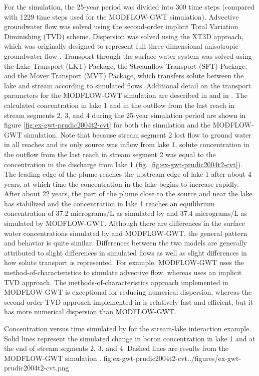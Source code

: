 For the \mf simulation, the 25-year period was divided into 300 time steps (compared with 1229 time steps used for the MODFLOW-GWT simulation).  Advective groundwater flow was solved using the second-order implicit Total Variation Diminishing (TVD) scheme.  Dispersion was solved using the XT3D approach, which was originally designed to represent full three-dimensional anisotropic groundwater flow \citep{modflow6xt3d}.  Transport through the surface water system was solved using the Lake Transport (LKT) Package, the Streamflow Transport (SFT) Package, and the Mover Transport (MVT) Package, which transfers solute between the lake and stream according to simulated flows.  Additional detail on the transport parameters for the MODFLOW-GWT simulation are described in \cite{modflowsfr1pack} and in \cite{modflowlak3pack}.  The calculated concentration in lake 1 and in the outflow from the last reach in stream segments 2, 3, and 4 during the 25-year simulation period are shown in figure \ref{fig:ex-gwt-prudic2004t2-cvt} for both the \mf simulation and the MODFLOW-GWT simulation.  Note that because stream segment 2 lost flow to ground water in all reaches and its only source was inflow from lake 1, solute concentration in the outflow from the last reach in stream segment 2 was equal to the concentration in the discharge from lake 1 (fig. \ref{fig:ex-gwt-prudic2004t2-cvt}).  The leading edge of the plume reaches the upstream edge of lake 1 after about 4 years, at which time the concentration in the lake begins to increase rapidly. After about 22 years, the part of the plume close to the source and near the lake has stabilized and the concentration in lake 1 reaches an equilibrium concentration of 37.2 micrograms/L as simulated by \mf and 37.4 micrograms/L as simulated by MODFLOW-GWT.  Although there are differences in the surface water concentrations simulated by \mf and MODFLOW-GWT, the general pattern and behavior is quite similar.  Differences between the two models are generally attributed to slight differences in simulated flows as well as slight differences in how solute transport is represented.  For example, MODFLOW-GWT uses the method-of-characteristics to simulate advective flow, whereas \mf uses an implicit TVD approach.  The methods-of-characteristics approach implemented in MODFLOW-GWT is exceptional for reducing numerical dispersion, whereas the second-order TVD approach implemented in \mf is relatively fast and efficient, but it has more numerical dispersion than MODFLOW-GWT.  

\begin{StandardFigure}{
                                     Concentration versus time simulated by \mf for the stream-lake interaction example.  Solid lines represent the \mf simulated change in boron concentration in lake 1 and at the end of stream segments 2, 3, and 4.  Dashed lines are results from the MODFLOW-GWT simulation \citep{modflowsfr1pack}.  
                                     }{fig:ex-gwt-prudic2004t2-cvt}{../figures/ex-gwt-prudic2004t2-cvt.png}
\end{StandardFigure}            

